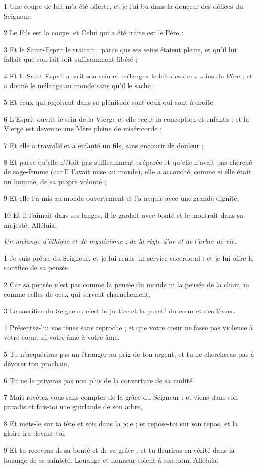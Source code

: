 \par 1 Une coupe de lait m'a été offerte, et je l'ai bu dans la douceur des délices du Seigneur.
\par 2 Le Fils est la coupe, et Celui qui a été traite est le Père :
\par 3 Et le Saint-Esprit le traitait : parce que ses seins étaient pleins, et qu'il lui fallait que son lait soit suffisamment libéré ;
\par 4 Et le Saint-Esprit ouvrit son sein et mélangea le lait des deux seins du Père ; et a donné le mélange au monde sans qu'il le sache :
\par 5 Et ceux qui reçoivent dans sa plénitude sont ceux qui sont à droite.
\par 6 L'Esprit ouvrit le sein de la Vierge et elle reçut la conception et enfanta ; et la Vierge est devenue une Mère pleine de miséricorde ;
\par 7 Et elle a travaillé et a enfanté un fils, sans encourir de douleur ;
\par 8 Et parce qu'elle n'était pas suffisamment préparée et qu'elle n'avait pas cherché de sage-femme (car Il l'avait mise au monde), elle a accouché, comme si elle était un homme, de sa propre volonté ;
\par 9 Et elle l'a mis au monde ouvertement et l'a acquis avec une grande dignité,
\par 10 Et il l'aimait dans ses langes, il le gardait avec bonté et le montrait dans sa majesté. Alléluia.


\par \textit{Un mélange d'éthique et de mysticisme ; de la règle d'or et de l'arbre de vie.}

\par 1 Je suis prêtre du Seigneur, et je lui rends un service sacerdotal : et je lui offre le sacrifice de sa pensée.
\par 2 Car sa pensée n'est pas comme la pensée du monde ni la pensée de la chair, ni comme celles de ceux qui servent charnellement.
\par 3 Le sacrifice du Seigneur, c'est la justice et la pureté du cœur et des lèvres.
\par 4 Présentez-lui vos rênes sans reproche ; et que votre cœur ne fasse pas violence à votre cœur, ni votre âme à votre âme.
\par 5 Tu n'acquériras pas un étranger au prix de ton argent, et tu ne chercheras pas à dévorer ton prochain,
\par 6 Tu ne le priveras pas non plus de la couverture de sa nudité.
\par 7 Mais revêtez-vous sans compter de la grâce du Seigneur ; et viens dans son paradis et fais-toi une guirlande de son arbre,
\par 8 Et mets-le sur ta tête et sois dans la joie ; et repose-toi sur son repos, et la gloire ira devant toi,
\par 9 Et tu recevras de sa bonté et de sa grâce ; et tu fleuriras en vérité dans la louange de sa sainteté. Louange et honneur soient à son nom. Alléluia.

